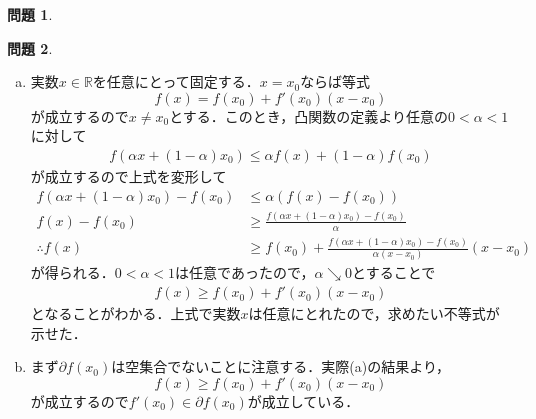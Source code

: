 \documentclass[titlepage]{jsarticle}
\theoremstyle{definition}
\newtheorem{Ex}{問題}
\theoremstyle{mystyle} %
\begin{document}
\begin{Ex}

\end{Ex}
\begin{Ex}\mbox{}\\
\begin{enumerate}[(a)]
\item 実数$x\in\mathbb{R}$を任意にとって固定する．$x=x_0$ならば等式
$$f(x)=f(x_0)+f'(x_0)(x-x_0)$$
が成立するので$x\neq x_0$とする．このとき，凸関数の定義より任意の$0<\alpha<1$に対して
\begin{align*}
f(\alpha x+(1-\alpha)x_0)\leq \alpha f(x)+(1-\alpha)f(x_0)
\end{align*}
が成立するので上式を変形して
\begin{align*}
f(\alpha x+(1-\alpha)x_0)-f(x_0)&\leq \alpha (f(x)-f(x_0))\\
f(x)-f(x_0)&\geq \frac{f(\alpha x+(1-\alpha)x_0)-f(x_0)}{\alpha}\\
\therefore f(x)&\geq f(x_0)+\frac{f(\alpha x+(1-\alpha)x_0)-f(x_0)}{\alpha(x-x_0)}(x-x_0)
\end{align*}
が得られる．$0<\alpha<1$は任意であったので，$\alpha\searrow 0$とすることで
\begin{align*}
f(x)\geq f(x_0)+f'(x_0)(x-x_0)
\end{align*}
となることがわかる．上式で実数$x$は任意にとれたので，求めたい不等式が示せた．\\

\item まず$\partial f(x_0)$は空集合でないことに注意する．実際(a)の結果より，
$$f(x)\geq f(x_0)+f'(x_0)(x-x_0)$$
が成立するので$f'(x_0)\in \partial f(x_0)$が成立している．\\


\end{enumerate}
\end{Ex}
\end{document}
